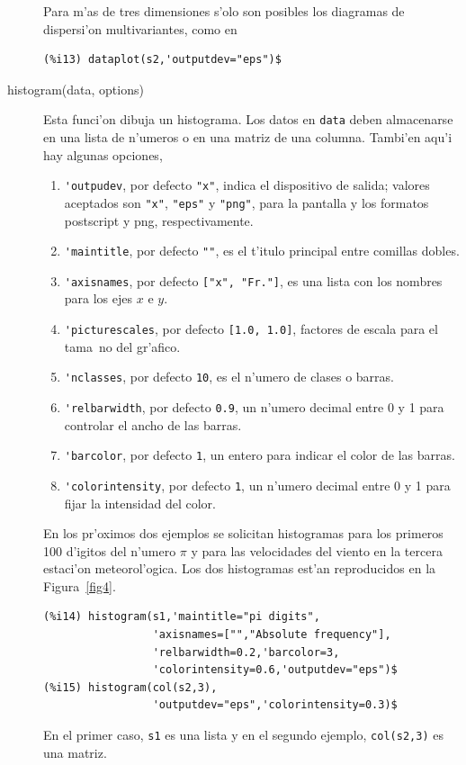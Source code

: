 \documentclass[spanish,12pt,a4paper]{article}
\begin{document}
\begin{description}
Para m'as de tres dimensiones s'olo son posibles los diagramas de dispersi'on multivariantes, como en
\begin{verbatim}
(%i13) dataplot(s2,'outputdev="eps")$
\end{verbatim}


\item[histogram(data, options)] Esta funci'on dibuja un histograma. Los datos en \verb|data| deben almacenarse en una lista de n'umeros o en una matriz de una columna. Tambi'en aqu'i hay algunas opciones,

\begin{enumerate}
\item \verb|'outpudev|, por defecto \verb|"x"|, indica el dispositivo de salida; valores aceptados son \verb|"x"|, \verb|"eps"| y \verb|"png"|, para la pantalla y los formatos postscript y png, respectivamente.
\item \verb|'maintitle|, por defecto \verb|""|, es el t'itulo principal entre comillas dobles.
\item \verb|'axisnames|, por defecto \verb|["x", "Fr."]|, es una lista con los nombres para los ejes $x$ e $y$.
\item \verb|'picturescales|, por defecto \verb|[1.0, 1.0]|, factores de escala para el tama~no del gr'afico.
\item \verb|'nclasses|, por defecto \verb|10|, es el n'umero de clases o barras.
\item \verb|'relbarwidth|, por defecto \verb|0.9|, un n'umero decimal entre 0 y 1 para controlar el ancho de las barras.
\item \verb|'barcolor|, por defecto \verb|1|, un entero para indicar el color de las barras.
\item \verb|'colorintensity|, por defecto \verb|1|, un n'umero decimal entre 0 y 1 para fijar la intensidad del color.
\end{enumerate}

En los pr'oximos dos ejemplos se solicitan histogramas para los primeros 100 d'igitos del n'umero $\pi$ y para las velocidades del viento en la tercera estaci'on meteorol'ogica. Los dos histogramas est'an reproducidos en la Figura~\ref{fig4}.
\begin{verbatim}
(%i14) histogram(s1,'maintitle="pi digits",
                 'axisnames=["","Absolute frequency"],
                 'relbarwidth=0.2,'barcolor=3,
                 'colorintensity=0.6,'outputdev="eps")$
(%i15) histogram(col(s2,3),
                 'outputdev="eps",'colorintensity=0.3)$
\end{verbatim}
En el primer caso, \verb|s1| es una lista y en el segundo ejemplo, \verb|col(s2,3)| es una matriz.


\end{description}
\end{document}
